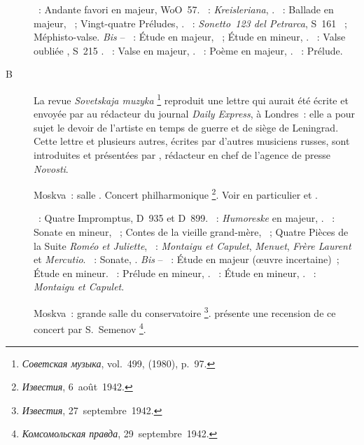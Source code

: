 \begin{description}
 \textsc{\Beethoven{}}~: Andante favori en \kF majeur, WoO~57.
 \textsc{\Schumann{}}~: \emph{Kreisleriana}, .
 \textsc{\Chopin{}}~: Ballade en \kA \Flat majeur, ~; Vingt-quatre
 Préludes, .
 \textsc{\Liszt{}}~: \emph{Sonetto~123 del Petrarca}, S~161 ~;
 Méphisto-valse.
 \emph{Bis} -- \textsc{\Chopin{}}~: Étude en \kE majeur, 
 ~; Étude en \kC \Sharp mineur,  .
 \textsc{\Liszt{}}~: Valse oubliée , S~215 .
 \textsc{\Chopin{}}~: Valse en \kG \Flat majeur,  .
 \textsc{\Scriabine{}}~: Poème en \kF \Sharp majeur,  .
 \textsc{\Chopin{}}~: Prélude.
 \item[B\DateWithWeekDay{1942-07-10}]
 La revue \emph{Sovetskaja muzyka}%
 \footnote{\foreignlanguage{russian}{\emph{Советская музыка}}, vol.~499,
  (1980), p.~97.}
 reproduit une lettre qui aurait été écrite et envoyée par \VSofronitsky{}
 au rédacteur du journal \emph{Daily Express}, à Londres~: elle a pour sujet
 le devoir de l'artiste en temps de guerre et de siège de Leningrad.
 Cette lettre et plusieurs autres, écrites par d'autres musiciens russes,
 sont introduites et présentées par \citet{Krasilchtchik80}, rédacteur en
 chef de l'agence de presse \emph{Novosti}.
 \item[\DateWithWeekDay{1942-08-09}]
 Moskva~: salle \Tchaikovski{}.
 Concert philharmonique%
 \footnote{\foreignlanguage{russian}{\emph{Известия}}, 6~août~1942.}.
 Voir en particulier \citet[p.~442]{Milshteyn82a} et
 \citet[p.~393]{Nikonovich08}.

 \textsc{\Schubert{}}~: Quatre Impromptus, D~935 et D~899.
 \textsc{\Schumann{}}~: \emph{Humoreske} en \kB \Flat majeur, .
 \textsc{\Prokofiev{}}~: Sonate en \kA mineur, ~; Contes de la
 vieille grand-mère, ~; Quatre Pièces de la Suite \emph{Roméo et
 Juliette}, ~: \emph{Montaigu et Capulet}, \emph{Menuet},
 \emph{Frère Laurent} et \emph{Mercutio}.
 \textsc{\Scriabine{}}~: Sonate, .
 \emph{Bis} -- \textsc{\Scriabine{}}~: Étude en \kE majeur (œuvre
 incertaine)~; Étude en \kB \Flat mineur.
 \textsc{\Rachmaninov{}}~: Prélude en \kC \Sharp mineur, 
 .
 \textsc{\Scriabine{}}~: Étude en \kD \Sharp mineur,  .
 \textsc{\Prokofiev{}}~: \emph{Montaigu et Capulet}.
 \item[\DateWithWeekDay{1942-09-27}]
 Moskva~: grande salle du conservatoire%
 \footnote{\foreignlanguage{russian}{\emph{Известия}}, 27~septembre~1942.}.
 \citet{Lazarev20} présente une recension de ce concert par S.~Semenov%
 \footnote{\foreignlanguage{russian}{\emph{Комсомольская правда}},
 29~septembre~1942.}.


\end{description}
